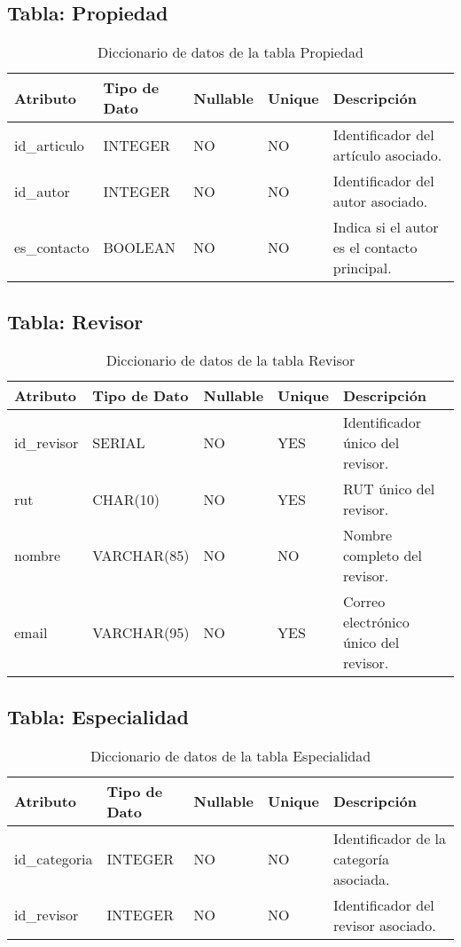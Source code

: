 \documentclass{article}
\begin{document}
\subsection{Tabla: Propiedad}
\begin{table}[H]
\centering
\begin{tabular}{|l|l|l|l|p{6cm}|}
\hline
\textbf{Atributo} & \textbf{Tipo de Dato} & \textbf{Nullable} & \textbf{Unique} & \textbf{Descripción} \\ \hline
id\_articulo & INTEGER & NO & NO & Identificador del artículo asociado. \\ \hline
id\_autor & INTEGER & NO & NO & Identificador del autor asociado. \\ \hline
es\_contacto & BOOLEAN & NO & NO & Indica si el autor es el contacto principal. \\ \hline
\end{tabular}
\caption{Diccionario de datos de la tabla Propiedad}
\label{tab:propiedad}
\end{table}

\subsection{Tabla: Revisor}
\begin{table}[H]
\centering
\begin{tabular}{|l|l|l|l|p{6cm}|}
\hline
\textbf{Atributo} & \textbf{Tipo de Dato} & \textbf{Nullable} & \textbf{Unique} & \textbf{Descripción} \\ \hline
id\_revisor & SERIAL & NO & YES & Identificador único del revisor. \\ \hline
rut & CHAR(10) & NO & YES & RUT único del revisor. \\ \hline
nombre & VARCHAR(85) & NO & NO & Nombre completo del revisor. \\ \hline
email & VARCHAR(95) & NO & YES & Correo electrónico único del revisor. \\ \hline
\end{tabular}
\caption{Diccionario de datos de la tabla Revisor}
\label{tab:revisor}
\end{table}

\subsection{Tabla: Especialidad}
\begin{table}[H]
\centering
\begin{tabular}{|l|l|l|l|p{6cm}|}
\hline
\textbf{Atributo} & \textbf{Tipo de Dato} & \textbf{Nullable} & \textbf{Unique} & \textbf{Descripción} \\ \hline
id\_categoria & INTEGER & NO & NO & Identificador de la categoría asociada. \\ \hline
id\_revisor & INTEGER & NO & NO & Identificador del revisor asociado. \\ \hline
\end{tabular}
\caption{Diccionario de datos de la tabla Especialidad}
\label{tab:especialidad}
\end{table}
\end{document}
